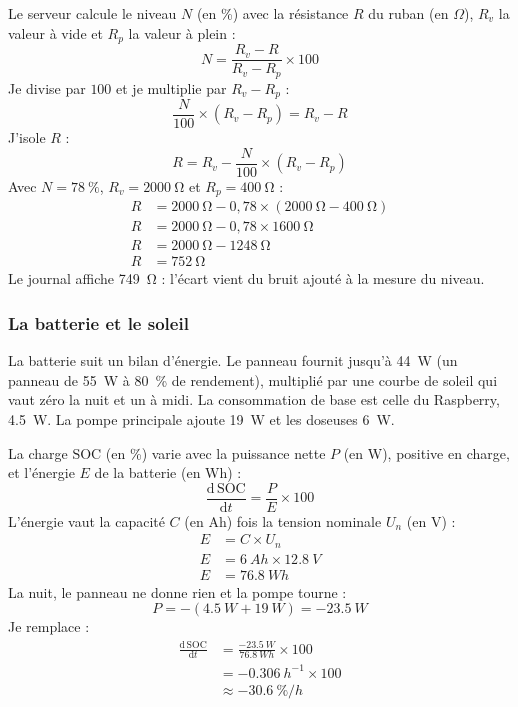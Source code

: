 \begin{demonstration}
Le serveur calcule le niveau $N$ (en \%) avec la résistance $R$ du ruban (en $\Omega$), $R_v$ la valeur à vide et $R_p$ la valeur à plein :
\[
N = \frac{R_v - R}{R_v - R_p}\times 100
\]
Je divise par $100$ et je multiplie par $R_v - R_p$ :
\[
\frac{N}{100}\times(R_v - R_p) = R_v - R
\]
J'isole $R$ :
\[
R = R_v - \frac{N}{100}\times(R_v - R_p)
\]
Avec $N = \qty{78}{\percent}$, $R_v = \qty{2000}{\ohm}$ et $R_p = \qty{400}{\ohm}$ :
\begin{align*}
R &= \qty{2000}{\ohm} - 0{,}78\times(\qty{2000}{\ohm} - \qty{400}{\ohm})\\
R &= \qty{2000}{\ohm} - 0{,}78\times\qty{1600}{\ohm}\\
R &= \qty{2000}{\ohm} - \qty{1248}{\ohm}\\
R &= \qty{752}{\ohm}
\end{align*}
Le journal affiche \qty{749}{\ohm} : l'écart vient du bruit ajouté à la mesure du niveau.
\end{demonstration}

\subsubsection*{La batterie et le soleil}

La batterie suit un bilan d'énergie. Le panneau fournit jusqu'à \qty{44}{W} (un panneau de \qty{55}{W} à \qty{80}{\percent} de rendement), multiplié par une courbe de soleil qui vaut zéro la nuit et un à midi. La consommation de base est celle du Raspberry, \qty{4,5}{W}. La pompe principale ajoute \qty{19}{W} et les doseuses \qty{6}{W}.

\begin{demonstration}
La charge $\mathrm{SOC}$ (en \%) varie avec la puissance nette $P$ (en W), positive en charge, et l'énergie $E$ de la batterie (en Wh) :
\[
\frac{\mathrm{d}\,\mathrm{SOC}}{\mathrm{d}t} = \frac{P}{E}\times 100
\]
L'énergie vaut la capacité $C$ (en Ah) fois la tension nominale $U_n$ (en V) :
\begin{align*}
E &= C\times U_n\\
E &= \qty{6}{Ah}\times\qty{12,8}{V}\\
E &= \qty{76,8}{Wh}
\end{align*}
La nuit, le panneau ne donne rien et la pompe tourne :
\[
P = -(\qty{4,5}{W} + \qty{19}{W}) = \qty{-23,5}{W}
\]
Je remplace :
\begin{align*}
\frac{\mathrm{d}\,\mathrm{SOC}}{\mathrm{d}t} &= \frac{\qty{-23,5}{W}}{\qty{76,8}{Wh}}\times 100\\
&= \qty{-0,306}{h^{-1}}\times 100\\
&\approx \qty{-30,6}{\percent/h}
\end{align*}
\end{demonstration}

